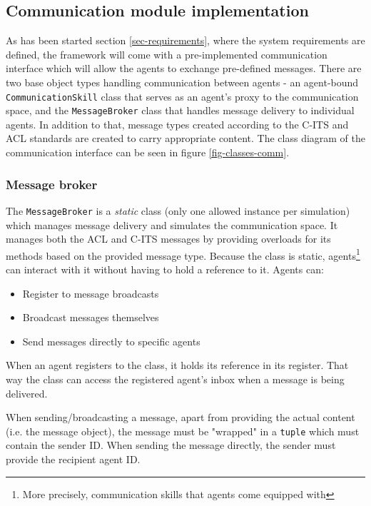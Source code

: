 \documentclass[0main.tex]{subfiles}
\begin{document}
\subsection{Communication module implementation}

As has been started section \ref{sec-requirements}, where the system requirements are
defined, the framework will come with a pre-implemented communication interface which will 
allow the agents to exchange pre-defined messages. There are two
base object types handling communication between agents - an agent-bound
\texttt{CommunicationSkill} class that serves as an agent's proxy to the communication space,
and the \texttt{MessageBroker} class that handles message delivery to individual agents. In
addition to that, message types created according to the C-ITS and ACL standards are created to
carry appropriate content. The class diagram of the communication interface can be seen in
figure \ref{fig-classes-comm}.

\subsubsection{Message broker}

The \texttt{MessageBroker} is a \emph{static} class (only one allowed instance per 
simulation) which manages message delivery and simulates the communication space. 
It manages both the ACL and C-ITS messages by providing overloads for its methods 
based on the provided message type. Because the class is static, agents\footnote{More precisely,
communication skills that agents come equipped with} can interact with it without 
having to hold a reference to it. Agents can:

\begin{itemize}
    \item Register to message broadcasts
    \item Broadcast messages themselves 
    \item Send messages directly to specific agents
\end{itemize}

When an agent registers to the class, it holds its reference in its register. 
That way the class can access the registered agent's inbox when a message is 
being delivered.

When sending/broadcasting a message, apart from providing the actual content (i.e. 
the message object), the message must be "wrapped" in a \texttt{tuple} which must 
contain the sender ID. When sending the message directly, the sender must 
provide the recipient agent ID. 
\end{document}

